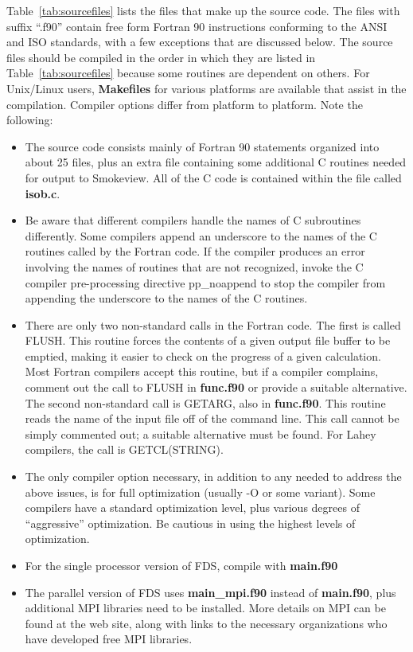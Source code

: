 \documentclass[11pt]{book}
\begin{document}
Table~\ref{tab:sourcefiles} lists the files that make up the source code.
The files with suffix ``.f90'' contain free form Fortran 90
instructions conforming to the ANSI and ISO standards, with a few exceptions that are discussed below.
The source files should be compiled in the order in which they are listed
in Table~\ref{tab:sourcefiles} because some routines are dependent on others.
For Unix/Linux users, {\bf Makefiles} for various platforms are available that assist in the
compilation. Compiler options differ from platform to platform.
Note the following:
\begin{itemize}
\item The source code consists mainly of Fortran 90
statements organized into about 25 files, plus an extra file containing
some additional C routines needed for output to Smokeview.
All of the C code is contained within the file called {\bf isob.c}.
\item Be aware that different
compilers handle the names of C subroutines differently. Some compilers
append an underscore to the names of the C routines called by the Fortran
code. If the compiler produces an error involving the names of routines
that are not recognized, invoke the C compiler pre-processing directive {\ct pp\_noappend} to stop
the compiler from appending the underscore to the names of the C routines.
\item There are only two non-standard calls in the Fortran code. The first is called
{\ct FLUSH}. This routine forces the contents of a given output
file buffer to be emptied, making it easier to check on
the progress of a given calculation. Most Fortran compilers accept this
routine, but if a compiler complains, comment out the call to {\ct FLUSH} in {\bf func.f90} or provide a suitable alternative.
The second non-standard call is {\ct GETARG}, also in {\bf func.f90}. This routine reads the name of the input file off of the command line. This call cannot
be simply commented out; a suitable alternative must be found. For Lahey compilers, the call is {\ct GETCL(STRING)}.
\item The only compiler option necessary, in addition to any needed to
address the above issues, is for full optimization (usually -O or some variant). Some
compilers have a standard optimization level, plus various degrees of
``aggressive'' optimization. Be cautious in using the highest levels of optimization.
\item For the single processor version of FDS, compile with {\bf main.f90}
\item The parallel version of FDS uses {\bf main\_mpi.f90} instead of
{\bf main.f90}, plus additional MPI libraries need to be installed. More details on MPI can be found at the web site, along with links to the
necessary organizations who have developed free MPI libraries.
\end{itemize}
\end{document}
